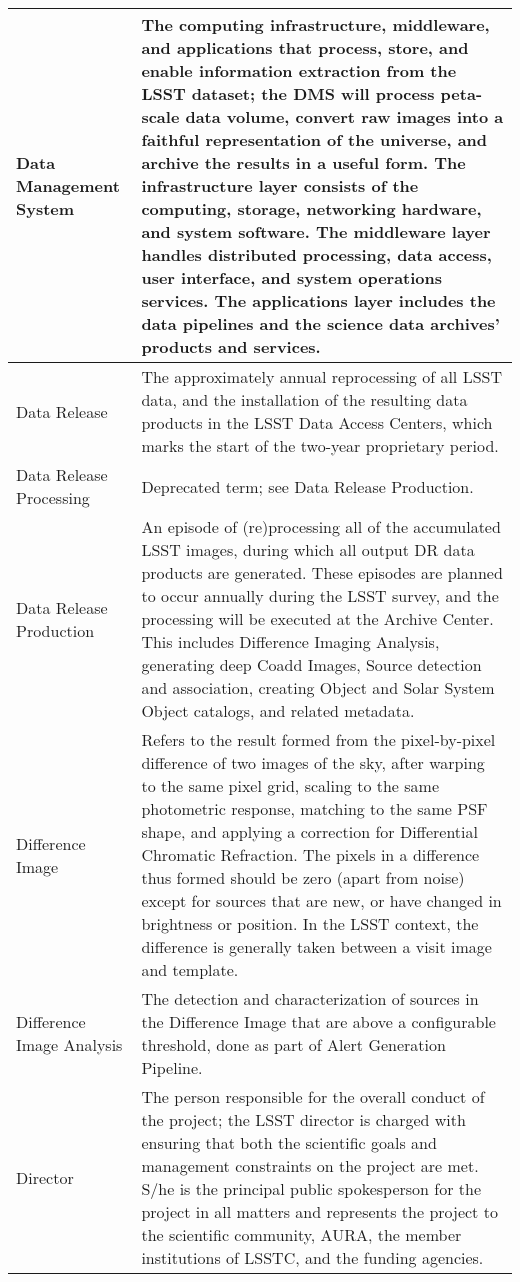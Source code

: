 \begin{longtable}{|l|p{}|}
Data Management System & The computing infrastructure, middleware, and applications that process, store, and enable information extraction from the \gls{LSST} dataset; the \gls{DMS} will process peta-scale data volume, convert raw images into a faithful representation of the universe, and archive the results in a useful form. The infrastructure layer consists of the computing, storage, networking hardware, and system software. The middleware layer handles distributed processing, data access, user interface, and system operations services. The applications layer includes the data pipelines and the science data archives' products and services. \\\hline
Data Release & The approximately annual reprocessing of all \gls{LSST} data, and the installation of the resulting data products in the \gls{LSST} Data Access Centers, which marks the start of the two-year proprietary period. \\\hline
Data Release Processing & Deprecated term; see \gls{Data Release} Production. \\\hline
Data Release Production & An episode of (re)processing all of the accumulated \gls{LSST} images, during which all output \gls{DR} data products are generated. These episodes are planned to occur annually during the \gls{LSST} survey, and the processing will be executed at the \gls{Archive} \gls{Center}. This includes Difference Imaging Analysis, generating deep Coadd Images, \gls{Source} detection and association, creating Object and \gls{Solar System Object} catalogs, and related \gls{metadata}. \\\hline
Difference Image & Refers to the result formed from the pixel-by-pixel difference of two images of the sky, after warping to the same pixel grid, scaling to the same photometric response, matching to the same \gls{PSF} \gls{shape}, and applying a correction for \gls{Differential Chromatic Refraction}. The pixels in a difference thus formed should be zero (apart from noise) except for sources that are new, or have changed in brightness or position. In the \gls{LSST} context, the difference is generally taken between a visit image and template.  \\\hline
Difference Image Analysis & The detection and characterization of sources in the \gls{Difference Image} that are above a configurable threshold, done as part of \gls{Alert} Generation Pipeline. \\\hline
Director & The person responsible for the overall conduct of the project; the \gls{LSST} director is charged with ensuring that both the scientific goals and management constraints on the project are met. S/he is the principal public spokesperson for the project in all matters and represents the project to the scientific community, \gls{AURA}, the member institutions of \gls{LSSTC}, and the funding agencies. \\\hline

\end{longtable}
